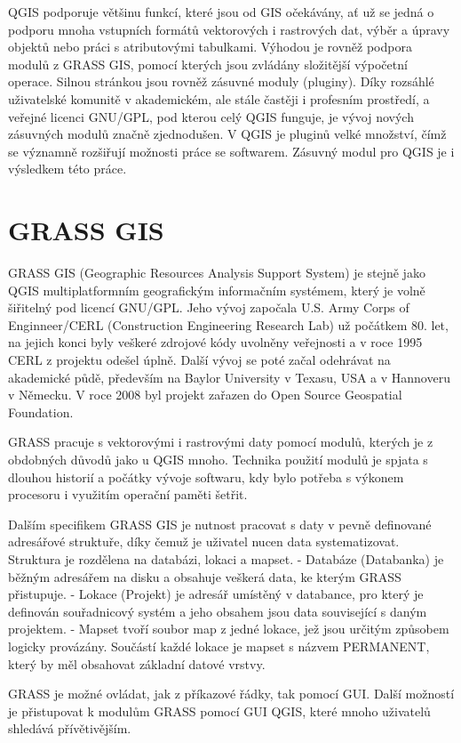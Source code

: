 QGIS podporuje většinu funkcí, které jsou od GIS očekávány, ať už se
jedná o podporu mnoha vstupních formátů vektorových i rastrových dat,
výběr a úpravy objektů nebo práci s atributovými tabulkami. Výhodou je
rovněž podpora modulů z GRASS GIS, pomocí kterých jsou zvládány
složitější výpočetní operace.  Silnou stránkou jsou rovněž zásuvné
moduly (pluginy). Díky rozsáhlé uživatelské komunitě v akademickém,
ale stále častěji i profesním prostředí, a veřejné licenci GNU/GPL,
pod kterou celý QGIS funguje, je vývoj nových zásuvných modulů značně
zjednodušen. V QGIS je pluginů velké množství, čímž se významně
rozšiřují možnosti práce se softwarem. Zásuvný modul pro QGIS je i
výsledkem této práce.

\section{GRASS GIS}
GRASS GIS (Geographic Resources Analysis Support System) je stejně
jako QGIS multiplatformním geografickým informačním systémem, který je
volně šiřitelný pod licencí GNU/GPL. Jeho vývoj započala U.S. Army
Corps of Enginneer/CERL (Construction Engineering Research Lab) už
počátkem 80. let, na jejich konci byly veškeré zdrojové kódy uvolněny
veřejnosti a v roce 1995 CERL z projektu odešel úplně. Další vývoj se
poté začal odehrávat na akademické půdě, především na Baylor
University v Texasu, USA a v Hannoveru v Německu. V roce 2008 byl
projekt zařazen do Open Source Geospatial Foundation.

GRASS pracuje s vektorovými i rastrovými daty pomocí modulů, kterých
je z obdobných důvodů jako u QGIS mnoho. Technika použití modulů je
spjata s dlouhou historií a počátky vývoje softwaru, kdy bylo potřeba
s výkonem procesoru i využitím operační paměti šetřit.

Dalším specifikem GRASS GIS je nutnost pracovat s daty v pevně
definované adresářové struktuře, díky čemuž je uživatel nucen data
systematizovat. Struktura je rozdělena na databázi, lokaci a mapset.
- Databáze (Databanka) je běžným adresářem na disku a obsahuje veškerá
data, ke kterým GRASS přistupuje.  - Lokace (Projekt) je adresář
umístěný v databance, pro který je definován souřadnicový systém a
jeho obsahem jsou data související s daným projektem.  - Mapset tvoří
soubor map z jedné lokace, jež jsou určitým způsobem logicky
provázány. Součástí každé lokace je mapset s názvem PERMANENT, který
by měl obsahovat základní datové vrstvy.

GRASS je možné ovládat, jak z příkazové řádky, tak pomocí GUI. Další
možností je přistupovat k modulům GRASS pomocí GUI QGIS, které mnoho
uživatelů shledává přívětivějším.
